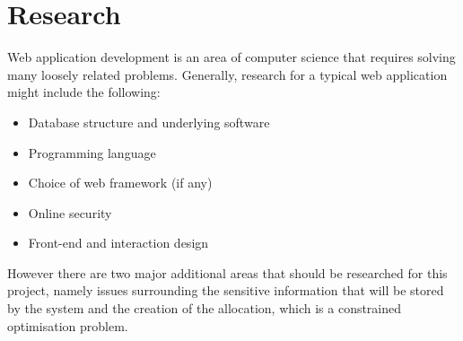 
\section{Research}
\label{sec:research}


Web application development is an area of computer science that requires
solving many loosely related problems. Generally, research for a typical web
application might include the following:

\begin{itemize}
  \item Database structure and underlying software
  \item Programming language
  \item Choice of web framework (if any)
  \item Online security
  \item Front-end and interaction design
\end{itemize}

However there are two major additional areas that should be researched for
this project, namely issues surrounding the sensitive information that will be
stored by the system and the creation of the allocation, which is a constrained
optimisation problem.
